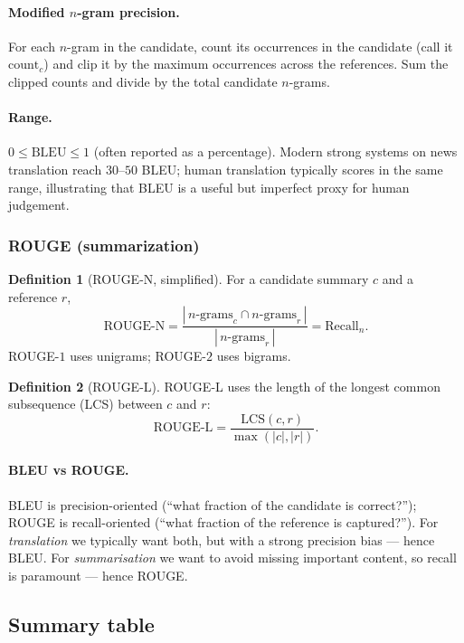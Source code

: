 \documentclass[12pt,a4paper]{report}
\theoremstyle{definition}
\newtheorem{definition}{Definition}[section]
\theoremstyle{remark}
\begin{document}
\paragraph{Modified $n$-gram precision.} For each $n$-gram in the candidate, count its occurrences in the candidate (call it $\mathrm{count}_c$) and clip it by the maximum occurrences across the references. Sum the clipped counts and divide by the total candidate $n$-grams.

\paragraph{Range.} $0 \le \mathrm{BLEU} \le 1$ (often reported as a percentage). Modern strong systems on news translation reach $30$--$50$ BLEU; human translation typically scores in the same range, illustrating that BLEU is a useful but imperfect proxy for human judgement.

\subsubsection*{ROUGE (summarization)}

\begin{definition}[ROUGE-N, simplified]
For a candidate summary $c$ and a reference $r$,
\[ \mathrm{ROUGE\text{-}N} = \frac{|\,n\text{-grams}_c \cap n\text{-grams}_r\,|}{|\,n\text{-grams}_r\,|} = \mathrm{Recall}_n. \]
ROUGE-$1$ uses unigrams; ROUGE-$2$ uses bigrams.
\end{definition}

\begin{definition}[ROUGE-L]
ROUGE-L uses the length of the longest common subsequence (LCS) between $c$ and $r$:
\[ \mathrm{ROUGE\text{-}L} = \frac{\mathrm{LCS}(c, r)}{\max(|c|, |r|)}. \]
\end{definition}

\paragraph{BLEU vs ROUGE.} BLEU is precision-oriented (``what fraction of the candidate is correct?''); ROUGE is recall-oriented (``what fraction of the reference is captured?''). For \emph{translation} we typically want both, but with a strong precision bias --- hence BLEU. For \emph{summarisation} we want to avoid missing important content, so recall is paramount --- hence ROUGE.

\subsection{Summary table}
\end{document}
